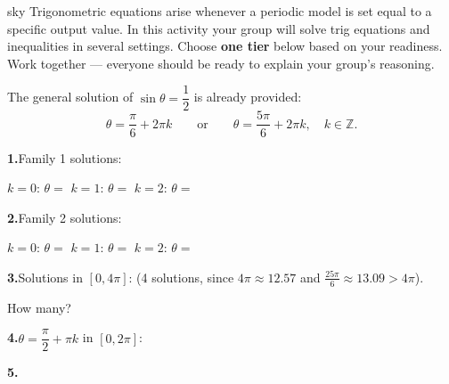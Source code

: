 \documentclass[10pt]{article}
\begin{document}
\namepartnerperiod

\vspace{0.08in}

\begin{scenariobox}{sky}
Trigonometric equations arise whenever a periodic model is set equal to
a specific output value. In this activity your group will solve trig
equations and inequalities in several settings. Choose \textbf{one tier}
below based on your readiness. Work together --- everyone should be ready
to explain your group's reasoning.
\end{scenariobox}

\vspace{0.08in}

\begin{tcolorbox}[colback=white, colframe=black!40,
    title=\textbf{Tier R --- Remediate (Key)},
    fonttitle=\bfseries, arc=2mm, left=3mm, right=3mm, top=2mm, bottom=2mm]

The general solution of $\sin\theta = \dfrac{1}{2}$ is already provided:
\[
  \theta = \frac{\pi}{6} + 2\pi k \qquad \text{or} \qquad \theta = \frac{5\pi}{6} + 2\pi k,
  \quad k \in \mathbb{Z}.
\]

\textbf{1.}\quad Family 1 solutions:

$k=0$: $\theta = $  \quad
$k=1$: $\theta = $  \quad
$k=2$: $\theta = $ 

\vspace{0.08in}
\textbf{2.}\quad Family 2 solutions:

$k=0$: $\theta = $  \quad
$k=1$: $\theta = $  \quad
$k=2$: $\theta = $ 

\vspace{0.08in}
\textbf{3.}\quad Solutions in $[0, 4\pi]$:  (4 solutions, since $4\pi \approx 12.57$ and $\tfrac{25\pi}{6} \approx 13.09 > 4\pi$).

How many? 

\vspace{0.08in}
\textbf{4.}\quad $\theta = \dfrac{\pi}{2} + \pi k$ in $[0,2\pi]$:

\vspace{0.08in}
\textbf{5.}\quad {}

\end{tcolorbox}
\end{document}
